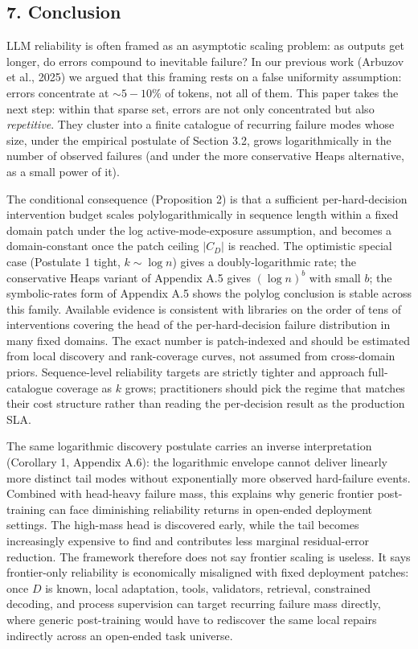 \documentclass[
]{article}
\begin{document}
\subsection{7. Conclusion}\label{conclusion}

LLM reliability is often framed as an asymptotic scaling problem: as
outputs get longer, do errors compound to inevitable failure? In our
previous work (Arbuzov et al., 2025) we argued that this framing rests
on a false uniformity assumption: errors concentrate at
\(\sim 5{-}10\%\) of tokens, not all of them. This paper takes the next
step: within that sparse set, errors are not only concentrated but also
\emph{repetitive}. They cluster into a finite catalogue of recurring
failure modes whose size, under the empirical postulate of Section 3.2,
grows logarithmically in the number of observed failures (and under the
more conservative Heaps alternative, as a small power of it).

The conditional consequence (Proposition 2) is that a sufficient
per-hard-decision intervention budget scales polylogarithmically in
sequence length within a fixed domain patch under the log
active-mode-exposure assumption, and becomes a domain-constant once the
patch ceiling \(|C_D|\) is reached. The optimistic special case
(Postulate 1 tight, \(k \sim \log n\)) gives a doubly-logarithmic rate;
the conservative Heaps variant of Appendix A.5 gives \((\log n)^b\) with
small \(b\); the symbolic-rates form of Appendix A.5 shows the polylog
conclusion is stable across this family. Available evidence is
consistent with libraries on the order of tens of interventions covering
the head of the per-hard-decision failure distribution in many fixed
domains. The exact number is patch-indexed and should be estimated from
local discovery and rank-coverage curves, not assumed from cross-domain
priors. Sequence-level reliability targets are strictly tighter and
approach full-catalogue coverage as \(k\) grows; practitioners should
pick the regime that matches their cost structure rather than reading
the per-decision result as the production SLA.

The same logarithmic discovery postulate carries an inverse
interpretation (Corollary 1, Appendix A.6): the logarithmic envelope
cannot deliver linearly more distinct tail modes without exponentially
more observed hard-failure events. Combined with head-heavy failure
mass, this explains why generic frontier post-training can face
diminishing reliability returns in open-ended deployment settings. The
high-mass head is discovered early, while the tail becomes increasingly
expensive to find and contributes less marginal residual-error
reduction. The framework therefore does not say frontier scaling is
useless. It says frontier-only reliability is economically misaligned
with fixed deployment patches: once \(D\) is known, local adaptation,
tools, validators, retrieval, constrained decoding, and process
supervision can target recurring failure mass directly, where generic
post-training would have to rediscover the same local repairs indirectly
across an open-ended task universe.
\end{document}
